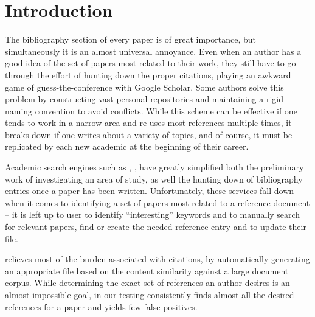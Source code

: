 \section{Introduction}
\label{sec:intro}

The bibliography section of every paper is of great importance, but
simultaneously it is an almost universal annoyance. Even when an author has a
good idea of the set of papers most related to their work, they still
have to go through the effort of hunting down the proper citations, playing an
awkward game of guess-the-conference with Google Scholar.  Some authors
solve this problem by constructing vast personal \bibtex repositories and
maintaining a rigid naming convention to avoid conflicts.  While this scheme can
be effective if one tends to work in a narrow area and re-uses most references
multiple times, it breaks down if one writes about a variety of topics, and of
course, it must be replicated by each new academic at the beginning of their
career.

Academic search engines such as \cite{CiteSeer}, \cite{Scholar},
\cite{MSAcademic} have greatly simplified both the preliminary work of
investigating an area of study, as well the hunting down of bibliography entries
once a paper has been written.  Unfortunately, these services fall down when it
comes to identifying a set of papers most related to a reference document -- it
is left up to user to identify ``interesting'' keywords and to manually search
for relevant papers, find or create the needed reference entry and to update
their \bibtex file.

 \name relieves most of the burden associated with citations, by automatically
generating an appropriate \bibtex file based on the content similarity against a
large document corpus.  While determining the exact set of references an author
desires is an almost impossible goal, in our testing \name consistently finds
almost all the desired references for a paper and yields few false positives.